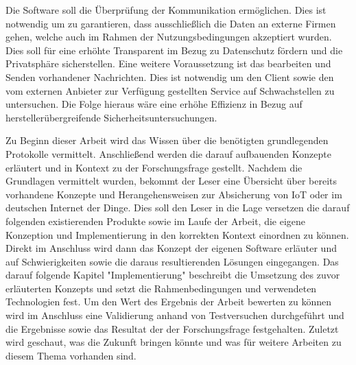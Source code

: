     Die Software soll die Überprüfung der Kommunikation ermöglichen. Dies ist notwendig um zu garantieren, dass ausschließlich die Daten an externe Firmen gehen, welche auch im Rahmen der Nutzungsbedingungen akzeptiert wurden. Dies soll für eine erhöhte Transparent im Bezug zu Datenschutz fördern und die Privatsphäre sicherstellen.
    Eine weitere Voraussetzung ist das bearbeiten und Senden vorhandener Nachrichten. Dies ist notwendig um den Client sowie den vom externen Anbieter zur Verfügung gestellten Service auf Schwachstellen zu untersuchen. Die Folge hieraus wäre eine erhöhe Effizienz in Bezug auf herstellerübergreifende Sicherheitsuntersuchungen.


Zu Beginn dieser Arbeit wird das Wissen über die benötigten grundlegenden Protokolle vermittelt.
Anschließend werden die darauf aufbauenden Konzepte erläutert und in Kontext zu der Forschungsfrage gestellt.
Nachdem die Grundlagen vermittelt wurden, bekommt der Leser eine Übersicht über bereits vorhandene Konzepte und Herangehensweisen zur Absicherung von \ac{IoT} oder im deutschen Internet der Dinge. Dies soll den Leser in die Lage versetzen die darauf folgenden existierenden Produkte sowie im Laufe der Arbeit, die eigene Konzeption und Implementierung in den korrekten Kontext einordnen zu können.
Direkt im Anschluss wird dann das Konzept der eigenen Software erläuter und auf Schwierigkeiten sowie die daraus resultierenden Lösungen eingegangen. Das darauf folgende Kapitel "Implementierung" beschreibt die Umsetzung des zuvor erläuterten Konzepts und setzt die Rahmenbedingungen und verwendeten Technologien fest. Um den Wert des Ergebnis der Arbeit bewerten zu können wird im Anschluss eine Validierung anhand von Testversuchen durchgeführt und die Ergebnisse sowie das Resultat der der Forschungsfrage festgehalten. Zuletzt wird geschaut, was die Zukunft bringen könnte und was für weitere Arbeiten zu diesem Thema vorhanden sind.